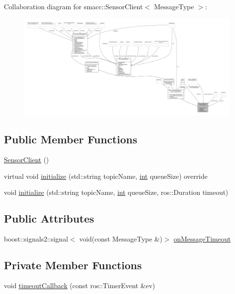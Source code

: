 Collaboration diagram for smacc\+:\+:Sensor\+Client$<$ Message\+Type $>$\+:
\nopagebreak
\begin{figure}[H]
\begin{center}
\leavevmode
\includegraphics[width=350pt]{classsmacc_1_1SensorClient__coll__graph}
\end{center}
\end{figure}
\subsection*{Public Member Functions}
\begin{DoxyCompactItemize}
\item 
\hyperlink{classsmacc_1_1SensorClient_a3d33430d7b925d88d816d384d3c533c1}{Sensor\+Client} ()
\item 
virtual void \hyperlink{classsmacc_1_1SensorClient_a281c2ec1790efffae6c36a2e7e0b93c2}{initialize} (std\+::string topic\+Name, \hyperlink{classint}{int} queue\+Size) override
\item 
void \hyperlink{classsmacc_1_1SensorClient_a597cd5044fb09d6e19c7bef9378229b8}{initialize} (std\+::string topic\+Name, \hyperlink{classint}{int} queue\+Size, ros\+::\+Duration timeout)
\end{DoxyCompactItemize}
\subsection*{Public Attributes}
\begin{DoxyCompactItemize}
\item 
boost\+::signals2\+::signal$<$ void(const Message\+Type \&)$>$ \hyperlink{classsmacc_1_1SensorClient_a3652c00d16a1a82ef6b43466ef360c72}{on\+Message\+Timeout}
\end{DoxyCompactItemize}
\subsection*{Private Member Functions}
\begin{DoxyCompactItemize}
\item 
void \hyperlink{classsmacc_1_1SensorClient_ad98d2d5097ea95d2e2bfccdc4b8fe7e2}{timeout\+Callback} (const ros\+::\+Timer\+Event \&ev)
\end{DoxyCompactItemize}
